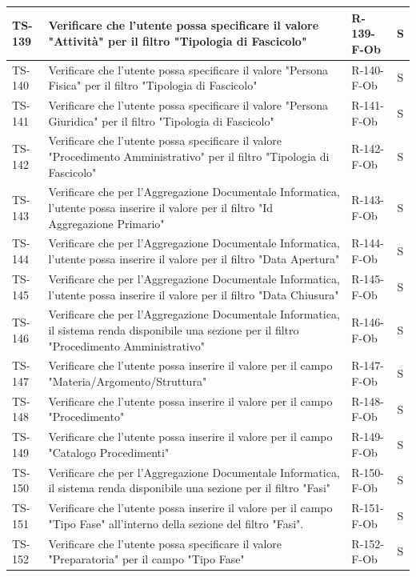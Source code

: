 \documentclass[a4paper,12pt]{article}
\begin{document}
\begin{longtable}{|p{1.5cm}|p{8.3cm}|p{2.4cm}|c|}
\hline
TS-139 & Verificare che l'utente possa specificare il valore "Attività" per il filtro "Tipologia di Fascicolo" & R-139-F-Ob & S \\
\hline
TS-140 & Verificare che l'utente possa specificare il valore "Persona Fisica" per il filtro "Tipologia di Fascicolo" & R-140-F-Ob & S \\
\hline
TS-141 & Verificare che l'utente possa specificare il valore "Persona Giuridica" per il filtro "Tipologia di Fascicolo" & R-141-F-Ob & S \\
\hline
TS-142 & Verificare che l'utente possa specificare il valore "Procedimento Amministrativo" per il filtro "Tipologia di Fascicolo" & R-142-F-Ob & S \\
\hline
TS-143 & Verificare che per l'Aggregazione Documentale Informatica, l'utente possa inserire il valore per il filtro "Id Aggregazione Primario" & R-143-F-Ob & S \\
\hline
TS-144 & Verificare che per l'Aggregazione Documentale Informatica, l'utente possa inserire il valore per il filtro "Data Apertura" & R-144-F-Ob & S \\
\hline
TS-145 & Verificare che per l'Aggregazione Documentale Informatica, l'utente possa inserire il valore per il filtro "Data Chiusura" & R-145-F-Ob & S \\
\hline
TS-146 & Verificare che per l'Aggregazione Documentale Informatica, il sistema renda disponibile una sezione per il filtro "Procedimento Amministrativo" & R-146-F-Ob & S \\
\hline
TS-147 & Verificare che l'utente possa inserire il valore per il campo "Materia/Argomento/Struttura" & R-147-F-Ob & S \\
\hline
TS-148 & Verificare che l'utente possa inserire il valore per il campo "Procedimento" & R-148-F-Ob & S \\
\hline
TS-149 & Verificare che l'utente possa inserire il valore per il campo "Catalogo Procedimenti" & R-149-F-Ob & S \\
\hline
TS-150 & Verificare che per l'Aggregazione Documentale Informatica, il sistema renda disponibile una sezione per il filtro "Fasi" & R-150-F-Ob & S \\
\hline
TS-151 & Verificare che l'utente possa inserire il valore per il campo "Tipo Fase" all'interno della sezione del filtro "Fasi". & R-151-F-Ob & S \\
\hline
TS-152 & Verificare che l'utente possa specificare il valore "Preparatoria" per il campo "Tipo Fase" & R-152-F-Ob & S \\

\end{longtable}
\end{document}
